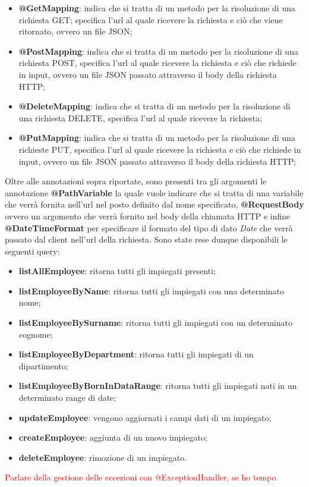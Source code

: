 \begin{itemize}
  \item \textbf{@GetMapping}: indica che si tratta di un metodo per la risoluzione di una richiesta GET; specifica l'url al quale ricevere la richiesta e ciò che viene ritornato, ovvero un file JSON;
  \item \textbf{@PostMapping}: indica che si tratta di un metodo per la risoluzione di una richiesta POST, specifica l'url al quale ricevere la richiesta e ciò che richiede in input, ovvero un file JSON passato attraverso il body della richiesta HTTP;
  \item  \textbf{@DeleteMapping}: indica che si tratta di un metodo per la risoluzione di una richiesta DELETE, specifica l'url al quale ricevere la richiesta;
  \item \textbf{@PutMapping}: indica che si tratta di un metodo per la risoluzione di una richieste PUT, specifica l'url al quale ricevere la richiesta e ciò che richiede in input, ovvero un file JSON passato attraverso il body della richiesta HTTP;
\end{itemize}
Oltre alle annotazioni sopra riportate, sono presenti tra gli argomenti le annotazione \textbf{@PathVariable} la quale vuole indicare che si tratta di una variabile che verrà fornita nell'url nel posto definito dal nome specificato, \textbf{@RequestBody} ovvero un argomento che verrà fornito nel body della chiamata HTTP e infine \textbf{@DateTimeFormat} per specificare il formato del tipo di dato \textit{Date} che verrà passato dal client nell'url della richiesta.
Sono state rese dunque disponibili le seguenti query:
\begin{itemize}
  \item \textbf{listAllEmployee}: ritorna tutti gli impiegati presenti;
  \item \textbf{listEmployeeByName}: ritorna tutti gli impiegati con una determinato nome;
  \item \textbf{listEmployeeBySurname}: ritorna tutti gli impiegati con un determinato cognome;
  \item \textbf{listEmployeeByDepartment}: ritorna tutti gli impiegati di un dipartimento;
  \item \textbf{listEmployeeByBornInDataRange}: ritorna tutti gli impiegati nati in un determinato range di date;
  \item \textbf{updateEmployee}: vengono aggiornati i campi dati di un impiegato;
  \item \textbf{createEmployee}: aggiunta di un nuovo impiegato;
  \item \textbf{deleteEmployee}: rimozione di un impiegato.
\end{itemize}
\textcolor{red}{Parlare della gestione delle eccezioni con @ExceptionHandler, se ho tempo.}
